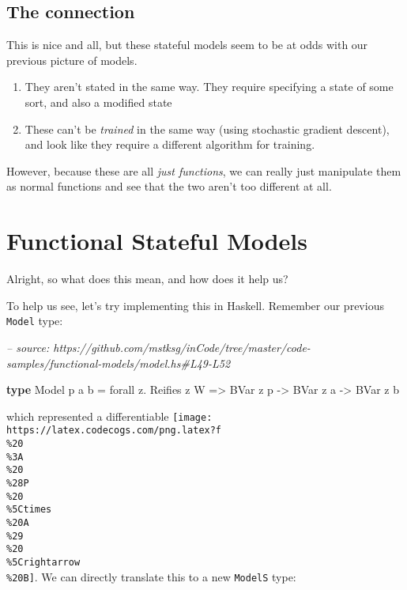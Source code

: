 \documentclass[]{article}
\newenvironment{Shaded}{}{}
\newcommand{\CommentTok}[1]{\textcolor[rgb]{0.38,0.63,0.69}{\textit{#1}}}
\newcommand{\DataTypeTok}[1]{\textcolor[rgb]{0.56,0.13,0.00}{#1}}
\newcommand{\FunctionTok}[1]{\textcolor[rgb]{0.02,0.16,0.49}{#1}}
\newcommand{\KeywordTok}[1]{\textcolor[rgb]{0.00,0.44,0.13}{\textbf{#1}}}
\newcommand{\NormalTok}[1]{#1}
\newcommand{\OtherTok}[1]{\textcolor[rgb]{0.00,0.44,0.13}{#1}}
\begin{document}
\hypertarget{the-connection}{%
\subsection{The connection}\label{the-connection}}

This is nice and all, but these stateful models seem to be at odds with our
previous picture of models.

\begin{enumerate}
\def\labelenumi{\arabic{enumi}.}
\tightlist
\item
  They aren't stated in the same way. They require specifying a state of some
  sort, and also a modified state
\item
  These can't be \emph{trained} in the same way (using stochastic gradient
  descent), and look like they require a different algorithm for training.
\end{enumerate}

However, because these are all \emph{just functions}, we can really just
manipulate them as normal functions and see that the two aren't too different at
all.

\hypertarget{functional-stateful-models}{%
\section{Functional Stateful Models}\label{functional-stateful-models}}

Alright, so what does this mean, and how does it help us?

To help us see, let's try implementing this in Haskell. Remember our previous
\texttt{Model} type:

\begin{Shaded}
\begin{Highlighting}[]
\CommentTok{-- source: https://github.com/mstksg/inCode/tree/master/code-samples/functional-models/model.hs#L49-L52}

\KeywordTok{type} \DataTypeTok{Model}\NormalTok{ p a b }\FunctionTok{=}\NormalTok{ forall z}\FunctionTok{.} \DataTypeTok{Reifies}\NormalTok{ z }\DataTypeTok{W}
                \OtherTok{=>} \DataTypeTok{BVar}\NormalTok{ z p}
                \OtherTok{->} \DataTypeTok{BVar}\NormalTok{ z a}
                \OtherTok{->} \DataTypeTok{BVar}\NormalTok{ z b}
\end{Highlighting}
\end{Shaded}

which represented a differentiable
\texttt{[image: https://latex.codecogs.com/png.latex?f\\\%20\\\%3A\\\%20\\\%28P\\\%20\\\%5Ctimes\\\%20A\\\%29\\\%20\\\%5Crightarrow\\\%20B]}.
We can directly translate this to a new \texttt{ModelS} type:
\end{document}

